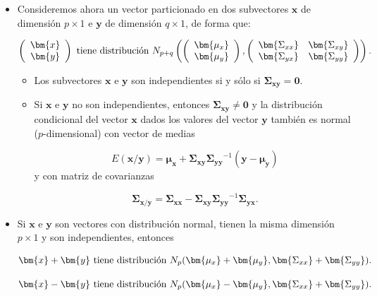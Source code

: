 \documentclass[
  a4paper,
  oneside]{scrbook}
\theoremstyle{definition}
\theoremstyle{definition}
\theoremstyle{definition}
\theoremstyle{definition}
\theoremstyle{remark}
\begin{document}
\begin{itemize}
  \[\bm{x_1} \textnormal{ tiene distribución }  N_p(\bm{\mu_1},\bm{\Sigma_{11}}),\]

  \[\bm{x_2} \textnormal{ tiene distribución }  N_{d-p}(\bm{\mu_2},\bm{\Sigma_{22}}).\]
  En particular cada componente \(x_i\) del vector \(\bm{x}\)
  (\(i=1,\ldots,d\)) tiene distribución \(N(\mu_i,\sigma_i^2)\). Es
  importante notar que el recíproco no es cierto, es decir, si la
  densidad de cada \(x_i\) es normal no se sigue necesariamente que
  \(\bm{x}\) sea normal multivariante.
\item
  Consideremos ahora un vector particionado en dos subvectores
  \(\bm{x}\) de dimensión \(p\times 1\) e \(\bm{y}\) de dimensión
  \(q\times 1\), de forma que:

  \[\left(\begin{array}{c}
  \bm{x}\\ 
  \bm{y}
  \end{array}
  \right) \textnormal{ tiene distribución }  N_{p+q}\left(\left(\begin{array}{c}
  \bm{\mu_x}\\ 
  \bm{\mu_y}
  \end{array}\right),\left(\begin{array}{cc}\bm{\Sigma_{xx}}&\bm{\Sigma_{xy}}\\ \bm{\Sigma_{yx}}&\bm{\Sigma_{yy}}\end{array}\right)\right).\]

  \begin{itemize}
  \item
    Los subvectores \(\bm{x}\) e \(\bm{y}\) son independientes si y sólo
    si \(\bm{\Sigma_{xy}}=\bm{0}\).
  \item
    Si \(\bm{x}\) e \(\bm{y}\) no son independientes, entonces
    \(\bm{\Sigma_{xy}}\neq\bm{0}\) y la distribución condicional del
    vector \(\bm{x}\) dados los valores del vector \(\bm{y}\) también es
    normal (\(p\)-dimensional) con vector de medias

    \[E(\bm{x}/\bm{y})=\bm{\mu_x}+\bm{\Sigma_{xy}}\bm{\Sigma_{yy}}^{-1}(\bm{y}-\bm{\mu_y})\]
    y con matriz de covarianzas

    \[\bm{\Sigma_{x/y}}=\bm{\Sigma_{xx}}-\bm{\Sigma_{xy}}\bm{\Sigma_{yy}}^{-1}\bm{\Sigma_{yx}}.\]
  \end{itemize}
\item
  Si \(\bm{x}\) e \(\bm{y}\) son vectores con distribución normal, tienen
  la misma dimensión \(p\times 1\) y son independientes, entonces

  \[\bm{x}+\bm{y}\textnormal{ tiene distribución }  N_p(\bm{\mu_x}+\bm{\mu_y},\bm{\Sigma_{xx}}+\bm{\Sigma_{yy}}).\]

  \[\bm{x}-\bm{y}\textnormal{ tiene distribución }  N_p(\bm{\mu_x}-\bm{\mu_y},\bm{\Sigma_{xx}}+\bm{\Sigma_{yy}}).\]
\end{itemize}
\end{document}
